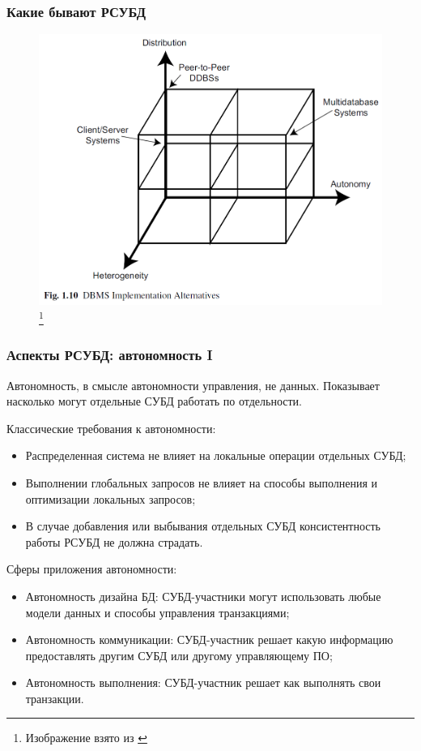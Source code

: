 \documentclass{beamer}
\begin{document}
\begin{frame}
\frametitle{Какие бывают РСУБД}

\begin{figure}[htb]
\includegraphics[width=\textwidth,height=0.80\textheight,keepaspectratio]{ozsu-4.png} 
\footnote{\tiny{Изображение взято из \cite{Ozsu2011}}}
\end{figure}

\end{frame}


\begin{frame}
\frametitle{Аспекты РСУБД: автономность I}
Автономность, в смысле автономности управления, не данных. Показывает насколько могут отдельные СУБД работать по отдельности.

Классические требования к автономности:
{\scriptsize
  \begin{itemize}
    \item Распределенная система не влияет на локальные операции отдельных СУБД;
    \item Выполнении глобальных запросов не влияет на способы выполнения и оптимизации локальных запросов;
    \item В случае добавления или выбывания отдельных СУБД консистентность работы РСУБД не должна страдать.
  \end{itemize}
}

Сферы приложения автономности:
{\scriptsize
\begin{itemize}
  \item Автономность дизайна БД: СУБД-участники могут использовать любые модели данных и способы управления транзакциями;
  \item Автономность коммуникации: СУБД-участник решает какую информацию предоставлять другим СУБД или \alert{другому управляющему ПО};
  \item Автономность выполнения: СУБД-участник решает как выполнять свои транзакции.
\end{itemize}
}
\end{frame}
\end{document}
